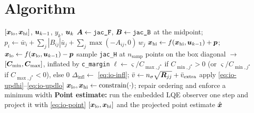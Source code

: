 \section{Algorithm}
\begin{algorithm}[H]
\caption{IntervalObserver --- one sampling period}
\begin{algorithmic}[1]
\Require $[\bm{x}_{\mathrm{lo}},\bm{x}_{\mathrm{hi}}]$, $\bm{u}_{k-1}$, $y_k$, $\bm{u}_k$
\State $\bm{A}\gets\texttt{jac\_F}$, $\bm{B}\gets\texttt{jac\_B}$ at the midpoint; \quad $p_i \gets \bar{w}_i + \sum_j|B_{ij}|\bar{u}_j + \sum_{j}\max(-A_{ij},0)\,w_j$
\State $\bm{x}_{\mathrm{hi}} \gets f(\bm{x}_{\mathrm{hi}},\bm{u}_{k-1}) + \bm{p}$; \quad $\bm{x}_{\mathrm{lo}} \gets f(\bm{x}_{\mathrm{lo}},\bm{u}_{k-1}) - \bm{p}$
\State sample \texttt{jac\_H} at $n_{\mathrm{samp}}$ points on the box diagonal $\to$ $[\bm{C}_{\min},\bm{C}_{\max}]$, inflated by \texttt{c\_margin}
\State $\ell \gets \varsigma/C_{\max,j^\star}$ if $C_{\min,j^\star}>0$ (or $\varsigma/C_{\min,j^\star}$ if $C_{\max,j^\star}<0$), else $0$
\State $\Delta_{\mathrm{infl}} \gets$ \eqref{eq:io-infl}; \quad $\bar{v} \gets n_\sigma\sqrt{\bm{R}_{jj}} + \bar{v}_{\mathrm{extra}}$
\State apply \eqref{eq:io-updhi}--\eqref{eq:io-updlo}
\State $\bm{x}_{\mathrm{lo}},\bm{x}_{\mathrm{hi}} \gets \operatorname{constrain}(\cdot)$; repair ordering and enforce a minimum width
\State \textbf{Point estimate:} run the embedded LQE observer one step and project it with \eqref{eq:io-point}
\Ensure $[\bm{x}_{\mathrm{lo}},\bm{x}_{\mathrm{hi}}]$ and the projected point estimate $\hat{\bm{x}}$
\end{algorithmic}
\end{algorithm}

